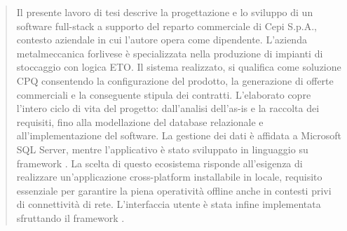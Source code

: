 \begin{abstract}
    Il presente lavoro di tesi descrive la progettazione e lo sviluppo di un software full-stack
    a supporto del reparto commerciale di Cepi S.p.A.\cite{Cepi}, 
    contesto aziendale in cui l'autore opera come dipendente.
    L'azienda metalmeccanica forlivese è specializzata nella produzione di impianti
    di stoccaggio con logica \ac{ETO}.
    Il sistema realizzato, si qualifica come soluzione \ac{CPQ}
    consentendo la configurazione del prodotto, la generazione di offerte
    commerciali e la conseguente stipula dei contratti.
    L'elaborato copre l'intero ciclo di vita del progetto: dall'analisi
    dell'as-is e la raccolta dei requisiti, fino alla modellazione del database relazionale e
    all'implementazione del software.
    La gestione dei dati è affidata a Microsoft SQL Server, mentre l'applicativo è stato sviluppato
    in linguaggio \csharp{} su framework \dotnet{}. La scelta di questo ecosistema risponde all'esigenza di
    realizzare un'applicazione cross-platform installabile in locale, requisito essenziale per garantire la piena
    operatività offline anche in contesti privi di connettività di rete.
    L'interfaccia utente è stata infine implementata sfruttando il framework \maui{}.
\end{abstract}
